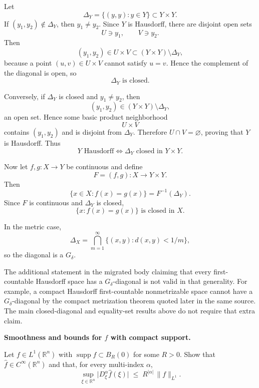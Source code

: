 \begin{solution}
Let
\[
\Delta_Y=\{(y,y):y\in Y\}\subset Y\times Y.
\]
If \((y_1,y_2)\notin\Delta_Y\), then \(y_1\neq y_2\). Since \(Y\) is Hausdorff, there are disjoint open sets
\[
U\ni y_1,\qquad V\ni y_2.
\]
Then
\[
(y_1,y_2)\in U\times V
\subset (Y\times Y)\setminus\Delta_Y,
\]
because a point \((u,v)\in U\times V\) cannot satisfy \(u=v\). Hence the complement of the diagonal is open, so
\[
\boxed{\Delta_Y\text{ is closed}.}
\]

Conversely, if \(\Delta_Y\) is closed and \(y_1\neq y_2\), then
\[
(y_1,y_2)\in (Y\times Y)\setminus\Delta_Y,
\]
an open set. Hence some basic product neighborhood
\[
U\times V
\]
contains \((y_1,y_2)\) and is disjoint from \(\Delta_Y\). Therefore \(U\cap V=\varnothing\), proving that \(Y\) is Hausdorff. Thus
\[
\boxed{Y\text{ Hausdorff}\iff \Delta_Y\text{ closed in }Y\times Y.}
\]

Now let \(f,g:X\to Y\) be continuous and define
\[
F=(f,g):X\to Y\times Y.
\]
Then
\[
\{x\in X:f(x)=g(x)\}
=
F^{-1}(\Delta_Y).
\]
Since \(F\) is continuous and \(\Delta_Y\) is closed,
\[
\boxed{\{x:f(x)=g(x)\}\text{ is closed in }X.}
\]

In the metric case,
\[
\Delta_X
=
\bigcap_{m=1}^{\infty}
\{(x,y):d(x,y)<1/m\},
\]
so the diagonal is a \(G_\delta\).

The additional statement in the migrated body claiming that every first-countable Hausdorff space has a \(G_\delta\)-diagonal is not valid in that generality. For example, a compact Hausdorff first-countable nonmetrizable space cannot have a \(G_\delta\)-diagonal by the compact metrization theorem quoted later in the same source. The main closed-diagonal and equality-set results above do not require that extra claim.
\end{solution}


\begin{problem}[CP-II-0286]
\label{prob:cp-ii-0286}
\textbf{Smoothness and bounds for $\widehat f$ with compact support.}

\hspace*{1.5em}Let $f\in L^1(\mathbb R^n)$ with $\operatorname{supp}f\subset B_R(0)$ for some $R>0$.
Show that $\widehat f\in C^\infty(\mathbb R^n)$ and that, for every multi-index $\alpha$,
\[
\sup_{\xi\in\mathbb R^n}\big|D_\xi^\alpha \widehat f(\xi)\big|
\;\le\; R^{|\alpha|}\,\|f\|_{L^1}.
\]
\end{problem}

